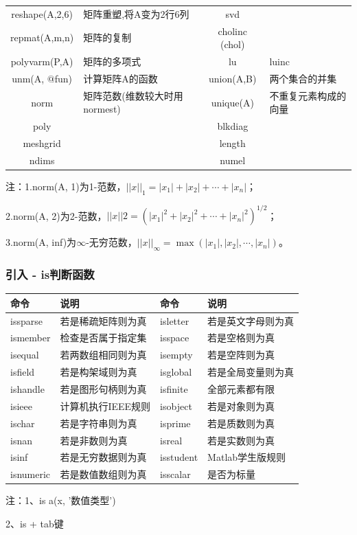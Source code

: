 \begin{longtable}{|c|l|c|l|}
            reshape(A,2,6)& 矩阵重塑,将A变为2行6列 &svd  &{}\\
            repmat(A,m,n)&  矩阵的复制 &cholinc (chol)&{}\\
            polyvarm(P,A)&  矩阵的多项式& lu& luinc\\
            unm(A, $@$fun)& 计算矩阵A的函数  &union(A,B)&  两个集合的并集\\
            norm  &矩阵范数(维数较大时用normest)& unique(A) &不重复元素构成的向量\\
            poly  &{}&  blkdiag &{}\\
            meshgrid    &{}&  length&{}\\
            ndims   &{}&  numel &{}\\
                \bottomrule
            \end{longtable}
            \noindent 注：1.norm(A, 1)为1-范数，$||x||_1=|x_1|+|x_2|+\cdots+|x_n|$；
            \par
            2.norm(A, 2)为2-范数，$||x||2=(|x_1|^2+|x_2|^2+\cdots+|x_n|^2)^{1/2}$；
            \par
            3.norm(A, inf)为$\infty$-无穷范数，$||x||_\infty=\max(|x_1|,|x_2|,\cdots,|x_n|)$。

        \subsubsection{引入 - is判断函数}
            \begin{table}[H]
            \centering
              \begin{tabular}{llll}%
                \toprule
                 命令 &  说明&命令 &  说明\\
                \midrule
            issparse  &若是稀疏矩阵则为真  & isletter  &若是英文字母则为真 \\
            ismember& 检查是否属于指定集&isspace&  若是空格则为真\\
            isequal   &若两数组相同则为真&isempty  &若是空阵则为真\\
            isfield &若是构架域则为真&isglobal  &若是全局变量则为真\\
            ishandle&   若是图形句柄则为真&isfinite  & 全部元素都有限\\
            isieee &  计算机执行IEEE规则&isobject  &若是对象则为真\\
            ischar  &若是字符串则为真&  isprime   &若是质数则为真\\
            isnan &若是非数则为真& isreal  &若是实数则为真\\
            isinf &若是无穷数据则为真& isstudent &Matlab学生版规则\\
            isnumeric &若是数值数组则为真  &isscalar&  是否为标量\\
                \bottomrule
            \end{tabular}
            \end{table}
            \noindent 注：1、is a(x, ’数值类型’)
            \par
             2、is + tab键


